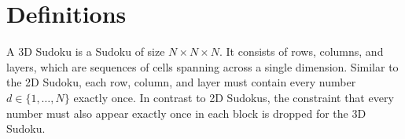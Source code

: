 \documentclass[11pt]{article}
\begin{document}
\section{Definitions}

A 3D Sudoku is a Sudoku of size $N \times N \times N$. It consists of rows, columns, and layers, which are sequences of cells spanning across a single dimension. Similar to the 2D Sudoku, each row, column, and layer must contain every number $d \in \{1, \hdots, N\}$ exactly once. In contrast to 2D Sudokus, the constraint that every number must also appear exactly once in each block is dropped for the 3D Sudoku. 
\end{document}

